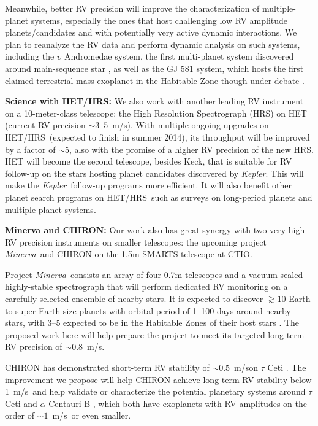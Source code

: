 \documentclass[12pt]{article}
\def\mps{m/s}
\def\kepler{{\it Kepler}}
\def\minerva{{\it Minerva}}
\def\hrs{HET/HRS}
\begin{document}
Meanwhile, better RV precision will improve the characterization of
multiple-planet systems, especially the ones that host challenging low
RV amplitude planets/candidates and with potentially very active
dynamic interactions. We plan to reanalyze the RV data and perform
dynamic analysis on such systems, including the $\upsilon$ Andromedae
system, the first multi-planet system discovered around main-sequence
star \citep{butler1999,wright2009,curiel2011}, as well as the GJ 581
system, which hosts the first claimed terrestrial-mass exoplanet in
the Habitable Zone \citep{vogt2010} though under debate
\citep[e.g.,][]{gregory2011,vogt2012,robertson2013}. 

\textbf{Science with \hrs: } We also work with another leading RV
instrument on a 10-meter-class telescope: the High Resolution
Spectrograph (HRS) on HET (current RV precision $\sim$3--5~\mps). With
multiple ongoing upgrades on \hrs\ (expected to finish in summer
2014), its throughput will be improved by a factor of $\sim$5, also
with the promise of a higher RV precision of the new HRS. HET will
become the second telescope, besides Keck, that is suitable for RV
follow-up on the stars hosting planet candidates discovered by
\kepler. This will make the \kepler\ follow-up programs more
efficient. It will also benefit other planet search programs on
\hrs\ such as surveys on long-period planets and multiple-planet
systems.

\textbf{Minerva and CHIRON: } Our work also has great synergy with two
very high RV precision instruments on smaller telescopes: the upcoming
project \minerva\ and CHIRON on
the 1.5m SMARTS telescope at CTIO. 

Project \minerva\ consists an array of four 0.7m telescopes and a
vacuum-sealed highly-stable spectrograph that will perform dedicated
RV monitoring on a carefully-selected ensemble of nearby stars. It is
expected to discover $\gtrsim 10$ Earth- to super-Earth-size planets
with orbital period of 1--100 days around nearby stars, with 3--5
expected to be in the Habitable Zones of their host stars
\citep{bottom2013,hogstrom2013}. The proposed work here will help
prepare the project to meet its targeted long-term RV precision of
$\sim 0.8$~\mps.

CHIRON has demonstrated short-term RV stability of $\sim0.5$~\mps on
$\tau$ Ceti \citep{chiron2013}. The improvement we propose will help
CHIRON achieve long-term RV stability below 1~\mps\ and help validate
or characterize the potential planetary systems around $\tau$ Ceti
\citep{tuomi2013} and $\alpha$ Centauri B
\citep{dumusque2012,hatzes2013}, which both have exoplanets with RV
amplitudes on the order of $\sim 1$~\mps\ or even smaller.
\end{document}
